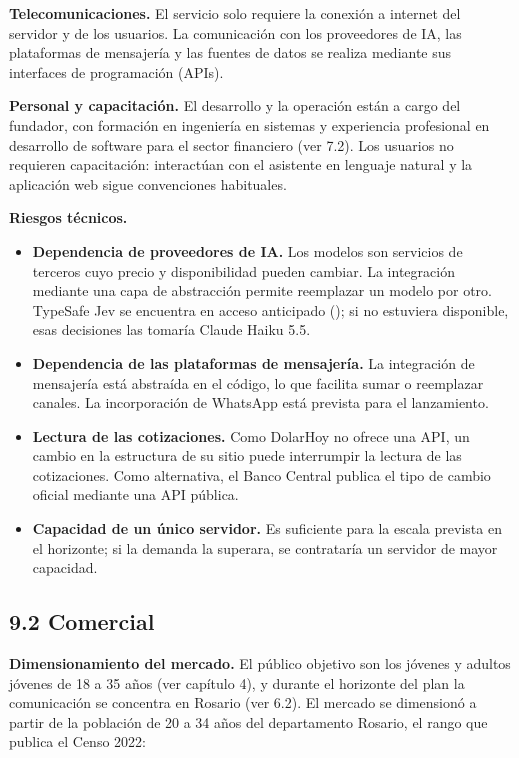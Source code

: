 \textbf{Telecomunicaciones.} El servicio solo requiere la conexión a
internet del servidor y de los usuarios. La comunicación con los
proveedores de IA, las plataformas de mensajería y las fuentes de datos
se realiza mediante sus interfaces de programación (APIs).

\textbf{Personal y capacitación.} El desarrollo y la operación están a
cargo del fundador, con formación en ingeniería en sistemas y
experiencia profesional en desarrollo de software para el sector
financiero (ver 7.2). Los usuarios no requieren capacitación:
interactúan con el asistente en lenguaje natural y la aplicación web
sigue convenciones habituales.

\textbf{Riesgos técnicos.}

\begin{itemize}
\tightlist
\item
  \textbf{Dependencia de proveedores de IA.} Los modelos son servicios
  de terceros cuyo precio y disponibilidad pueden cambiar. La
  integración mediante una capa de abstracción permite reemplazar un
  modelo por otro. TypeSafe Jev se encuentra en acceso anticipado
  (); si no estuviera
  disponible, esas decisiones las tomaría Claude Haiku 5.5.
\item
  \textbf{Dependencia de las plataformas de mensajería.} La integración
  de mensajería está abstraída en el código, lo que facilita sumar o
  reemplazar canales. La incorporación de WhatsApp está prevista para el
  lanzamiento.
\item
  \textbf{Lectura de las cotizaciones.} Como DolarHoy no ofrece una API,
  un cambio en la estructura de su sitio puede interrumpir la lectura de
  las cotizaciones. Como alternativa, el Banco Central publica el tipo
  de cambio oficial mediante una API pública.
\item
  \textbf{Capacidad de un único servidor.} Es suficiente para la escala
  prevista en el horizonte; si la demanda la superara, se contrataría un
  servidor de mayor capacidad.
\end{itemize}

\subsection*{9.2 Comercial}\label{comercial}

\textbf{Dimensionamiento del mercado.} El público objetivo son los
jóvenes y adultos jóvenes de 18 a 35 años (ver capítulo 4), y durante el
horizonte del plan la comunicación se concentra en Rosario (ver 6.2). El
mercado se dimensionó a partir de la población de 20 a 34 años del
departamento Rosario, el rango que publica el Censo 2022:

